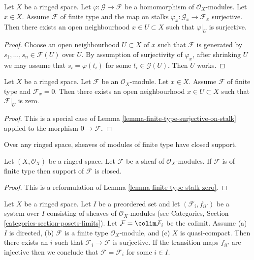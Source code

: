 \begin{lemma}
\label{lemma-finite-type-surjective-on-stalk}
Let $X$ be a ringed space.
Let $\varphi : \mathcal{G} \to \mathcal{F}$ be a homomorphism
of $\mathcal{O}_X$-modules.
Let $x \in X$. Assume $\mathcal{F}$ of finite type and
the map on stalks
$\varphi_x : \mathcal{G}_x \to \mathcal{F}_x$ surjective.
Then there exists an open neighbourhood
$x \in U \subset X$ such that $\varphi|_U$ is surjective.
\end{lemma}

\begin{proof}
Choose an open neighbourhood $U \subset X$ of $x$ such that $\mathcal{F}$ is
generated by $s_1, \ldots, s_n \in \mathcal{F}(U)$ over $U$.
By assumption of surjectivity of $\varphi_x$,
after shrinking $U$ we may assume that $s_i = \varphi(t_i)$
for some $t_i \in \mathcal{G}(U)$.
Then $U$ works.
\end{proof}

\begin{lemma}
\label{lemma-finite-type-stalk-zero}
Let $X$ be a ringed space.
Let $\mathcal{F}$ be an $\mathcal{O}_X$-module.
Let $x \in X$.
Assume $\mathcal{F}$ of finite type and $\mathcal{F}_x = 0$.
Then there exists an open neighbourhood
$x \in U \subset X$ such that $\mathcal{F}|_U$ is zero.
\end{lemma}

\begin{proof}
This is a special case of
Lemma \ref{lemma-finite-type-surjective-on-stalk}
applied to the morphism $0 \to \mathcal{F}$.
\end{proof}

\begin{lemma}
\label{lemma-support-finite-type-closed}
\begin{slogan}
Over any ringed space, sheaves of modules of finite type have closed support.
\end{slogan}
Let $(X, \mathcal{O}_X)$ be a ringed space.
Let $\mathcal{F}$ be a sheaf of $\mathcal{O}_X$-modules.
If $\mathcal{F}$ is of finite type then support of $\mathcal{F}$ is closed.
\end{lemma}

\begin{proof}
This is a reformulation of Lemma \ref{lemma-finite-type-stalk-zero}.
\end{proof}

\begin{lemma}
\label{lemma-finite-type-quasi-compact-colimit}
Let $X$ be a ringed space. Let $I$ be a preordered set and
let $(\mathcal{F}_i, f_{ii'})$ be a system over $I$ consisting of sheaves
of $\mathcal{O}_X$-modules (see
Categories, Section \ref{categories-section-posets-limits}).
Let $\mathcal{F} = \colim \mathcal{F}_i$ be the colimit. Assume
(a) $I$ is directed,
(b) $\mathcal{F}$ is a finite type $\mathcal{O}_X$-module, and
(c) $X$ is quasi-compact. Then there exists an $i$ such that
$\mathcal{F}_i \to \mathcal{F}$ is surjective.
If the transition maps $f_{ii'}$ are injective
then we conclude that $\mathcal{F} = \mathcal{F}_i$ for some $i \in I$.
\end{lemma}

